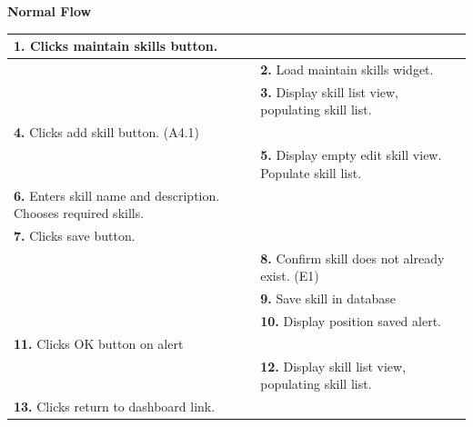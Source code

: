 \documentclass[letterpaper,12pt]{report}
\begin{document}
{ \centering \textbf{Normal Flow}
\begin{center}
\xuchead
\begin{tabular}{| p{8.5cm} | p{8.5cm} |}
\hline
\textbf{1.} Clicks maintain skills button. & \\
\hline
& \textbf{2.} Load maintain skills widget. \\
\hline
& \textbf{3.} Display skill list view, populating skill list. \\
\hline
\textbf{4.} Clicks add skill button. (A4.1) & \\
\hline
& \textbf{5.} Display empty edit skill view. Populate skill list. \\
\hline
\textbf{6.} Enters skill name and description. Chooses required skills. & \\
\hline
\textbf{7.} Clicks save button. & \\
\hline
& \textbf{8.} Confirm skill does not already exist. (E1) \\
\hline
& \textbf{9.} Save skill in database \\
\hline
& \textbf{10.} Display position saved alert. \\
\hline
\textbf{11.} Clicks OK button on alert & \\
\hline
& \textbf{12.} Display skill list view, populating skill list. \\
\hline
\textbf{13.} Clicks return to dashboard link. & \\
\hline



\end{tabular}
\end{center}}
\end{document}
